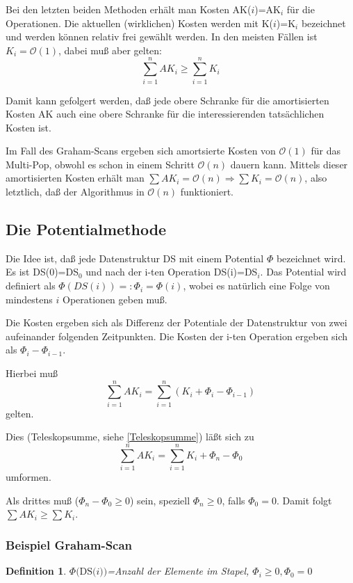\documentclass[ngerman,draft,parskip=half*,twoside]{scrreprt}
\theoremstyle{break}
\newtheorem{definition}{Definition}[chapter]
\theoremstyle{nonumberbreak}
\newcommand*{\OO}{\mathcal{O}}      %
\begin{document}
Bei den letzten beiden Methoden erhält man Kosten AK($i$)=AK$_i$ für die Operationen.
Die aktuellen (wirklichen) Kosten werden
mit K($i$)=K$_i$ bezeichnet und werden können relativ frei gewählt werden. In den meisten Fällen ist $K_i=\OO(1)$,
dabei muß aber gelten:
\[\sum_{i=1}^n AK_i \geq \sum_{i=1}^n K_i\]

Damit kann gefolgert werden, daß jede obere Schranke für die amortisierten Kosten AK auch eine obere Schranke
für die interessierenden tatsächlichen Kosten ist.

Im Fall des Graham-Scans ergeben sich amortsierte Kosten von $\OO(1)$ für das Multi-Pop, obwohl es schon in einem Schritt
$\OO(n)$ dauern kann. Mittels dieser amortisierten Kosten erhält man $\sum AK_i=\OO(n) \Rightarrow \sum K_i=\OO(n)$, also
letztlich, daß der Algorithmus in $\OO(n)$ funktioniert.

\subsection{Die Potentialmethode}
Die Idee ist, daß jede Datenstruktur DS mit einem Potential $\Phi$ bezeichnet wird. Es ist DS(0)=DS$_0$ und nach der i-ten
Operation DS(i)=DS$_i$. Das Potential wird definiert als $\Phi(DS(i))=:{\Phi}_i=\Phi(i)$, wobei es natürlich
eine Folge von mindestens $i$ Operationen geben muß.

Die Kosten ergeben sich als Differenz der Potentiale der Datenstruktur von zwei aufeinander folgenden Zeitpunkten. Die
Kosten der i-ten Operation ergeben sich als ${\Phi}_i-{\Phi}_{i-1}$.

Hierbei muß \[\sum_{i=1}^n AK_i=\sum_{i=1}^n (K_i+{\Phi}_i-{\Phi}_{i-1})\] gelten.

Dies (Teleskopsumme, siehe \autoref{Teleskopsumme}) läßt sich zu \[\sum_{i=1}^n AK_i=\sum_{i=1}^n
K_i+{\Phi}_n-{\Phi}_0\] umformen.

Als drittes muß (${\Phi}_n-{\Phi}_0 \geq 0$) sein, speziell ${\Phi}_n \geq 0$, falls ${\Phi}_0=0$. Damit folgt
$\sum AK_i \geq \sum K_i$.

\subsubsection{Beispiel Graham-Scan}

\begin{definition}
$\Phi \mbox{(DS(}i\mbox{))}$=Anzahl der Elemente im Stapel, ${\Phi}_i \geq 0, {\Phi}_0=0$
\end{definition}
\end{document}
